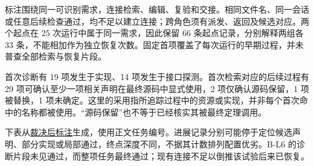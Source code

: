 标注围绕同一可识别需求，连接检索、编辑、复验和交接。相同文件名、同一会话或任意后续检查通过，均不足以建立连接；跨角色须有派发、返回及候选对应。两个起点在 25 次运行中属于同一需求，因此保留 66 条起点记录，分别解释两组各 33 条，不能相加作为独立恢复次数。固定首项覆盖了每次运行的早期过程，并未普查全部检索与恢复片段。

首次诊断有 19 项发生于实现、14 项发生于接口探测。首次检索对应的后续过程有 29 项可确认至少一项相关声明在最终源码中显式使用，2 项仅确认源码保留，1 项被替换，1 项未确定。这里的采用指所追踪过程中的资源或实现，并非每个首次命中的名称都被使用。“源码保留”也不等于已经核实其被最终定理调用。

下表从\href{research/semantic/adjudicated_annotations.json}{裁决后标注}生成，使用正文任务编号。进展记录分别可能停于定位候选声明、部分实现或局部通过，终点深度不同，不据其计数排列配置优劣。B-L6 的诊断片段未见通过，而整项任务最终通过；现有连接不足以倒推该试验后来已恢复。

